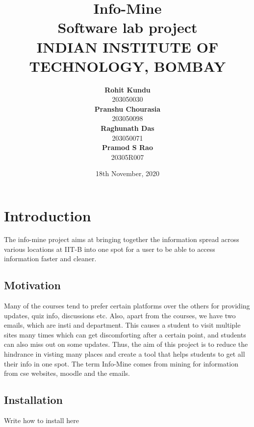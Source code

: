 \documentclass[12pt, letterpaper, twoside]{article}
\title{
    \textbf{Info-Mine}\\
    {Software lab project}\\
    {INDIAN INSTITUTE OF TECHNOLOGY, BOMBAY}
}
\author{ 
    \textbf{Rohit Kundu}\\203050030\\
    \textbf{Pranshu Chourasia}\\203050098\\
    \textbf{Raghunath Das}\\203050071\\
    \textbf{Pramod S Rao}\\20305R007\\
}
\date{18th November, 2020}
\begin{document}
\maketitle

\tableofcontents

\section{Introduction}
    The info-mine project aims at bringing together the information spread across various locations at IIT-B into one spot
    for a user to be able to access information faster and cleaner.

    \subsection{Motivation}
        Many of the courses tend to prefer certain platforms over the others for providing updates, quiz info, discussions etc. 
        Also, apart from the courses, we have two emails, which are insti and department.
        This causes a student to visit multiple sites many times which can get discomforting after a certain point, and students can also miss
        out on some updates.
        Thus, the aim of this project is to reduce the hindrance in visting many places and create a tool that helps students to get all their info
        in one spot. The term Info-Mine comes from mining for information from cse websites, moodle and the emails.
        
    \subsection{Installation}
    Write how to install here
\end{document}
